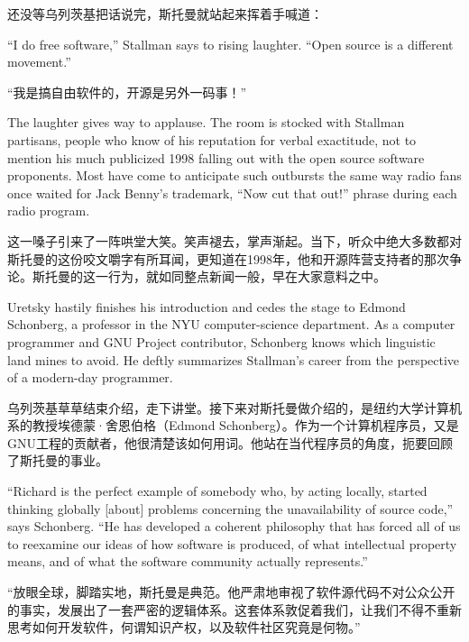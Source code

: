 \ifdefined\chs
还没等乌列茨基把话说完，斯托曼就站起来挥着手喊道：
\fi

\ifdefined\eng
``I do free software,'' Stallman says to rising laughter. ``Open source is a different movement.''
\fi

\ifdefined\chs
``我是搞自由软件的，开源是另外一码事！''
\fi

\ifdefined\eng
The laughter gives way to applause. The room is stocked with Stallman partisans, people who know of his reputation for verbal exactitude, not to mention his much publicized 1998 falling out with the open source software proponents. Most have come to anticipate such outbursts the same way radio fans once waited for Jack Benny's trademark, ``Now cut that out!'' phrase during each radio program.
\fi

\ifdefined\chs
这一嗓子引来了一阵哄堂大笑。笑声褪去，掌声渐起。当下，听众中绝大多数都对斯托曼的这份咬文嚼字有所耳闻，更知道在1998年，他和开源阵营支持者的那次争论。斯托曼的这一行为，就如同整点新闻一般，早在大家意料之中。
\fi

\ifdefined\eng
Uretsky hastily finishes his introduction and cedes the stage to Edmond Schonberg, a professor in the NYU computer-science department. As a computer programmer and GNU Project contributor, Schonberg knows which linguistic land mines to avoid. He deftly summarizes Stallman's career from the perspective of a modern-day programmer.
\fi

\ifdefined\chs
乌列茨基草草结束介绍，走下讲堂。接下来对斯托曼做介绍的，是纽约大学计算机系的教授埃德蒙·舍恩伯格（Edmond Schonberg）。作为一个计算机程序员，又是GNU工程的贡献者，他很清楚该如何用词。他站在当代程序员的角度，扼要回顾了斯托曼的事业。
\fi

\ifdefined\eng
``Richard is the perfect example of somebody who, by acting locally, started thinking globally [about] problems concerning the unavailability of source code,'' says Schonberg. ``He has developed a coherent philosophy that has forced all of us to reexamine our ideas of how software is produced, of what intellectual property means, and of what the software community actually represents.''\ifdefined\vtwo{}\fi
\fi

\ifdefined\chs
``放眼全球，脚踏实地，斯托曼是典范。他严肃地审视了软件源代码不对公众公开的事实，发展出了一套严密的逻辑体系。这套体系敦促着我们，让我们不得不重新思考如何开发软件，何谓知识产权，以及软件社区究竟是何物。''\ifdefined\vtwo{}\fi
\fi

